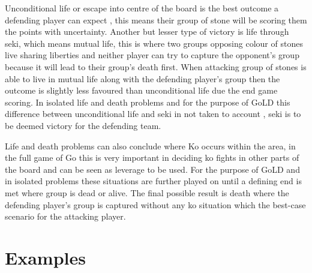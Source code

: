 \documentclass{l4proj}
\begin{document}
Unconditional life or escape into centre of the board is the best outcome a defending player can expect , this means their group of stone will be scoring them the points with uncertainty. Another but lesser type of victory is life through seki, which means mutual life, this is where two groups opposing colour of stones live sharing liberties and neither player can try to capture the opponent’s group because it will lead to their group’s death first. When attacking group of stones is able to live in mutual life along with the defending player’s group then the outcome is slightly less favoured than unconditional life due the end game scoring. In isolated life and death problems and for the purpose of GoLD this difference between unconditional life and seki in not taken to account , seki is to be deemed victory for the defending team.

Life and death problems can also conclude where Ko occurs within the area, in the full game of Go this is very important in deciding ko fights in other parts of the board and can be seen as leverage to be used.  For the purpose of GoLD and in isolated problems these situations are further played on until a defining end is met where group is dead or alive. The final possible result is death where the defending player’s group is captured without any ko situation which the best-case scenario for the attacking player.





\section{Examples}
\end{document}
